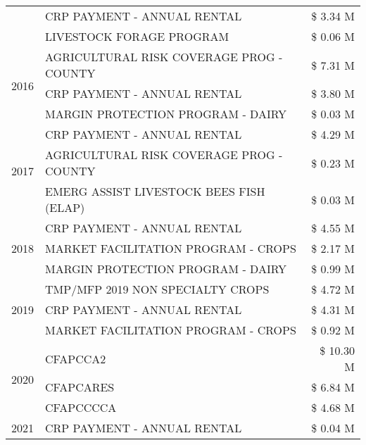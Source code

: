 \begin{tabular}{llr}
 & CRP PAYMENT - ANNUAL RENTAL & \$ 3.34 M \\
 & LIVESTOCK FORAGE PROGRAM & \$ 0.06 M \\
\cline{1-3}
\multirow[t]{3}{*}{2016} & AGRICULTURAL RISK COVERAGE PROG - COUNTY & \$ 7.31 M \\
 & CRP PAYMENT - ANNUAL RENTAL & \$ 3.80 M \\
 & MARGIN PROTECTION PROGRAM - DAIRY & \$ 0.03 M \\
\cline{1-3}
\multirow[t]{3}{*}{2017} & CRP PAYMENT - ANNUAL RENTAL & \$ 4.29 M \\
 & AGRICULTURAL RISK COVERAGE PROG - COUNTY & \$ 0.23 M \\
 & EMERG ASSIST LIVESTOCK BEES FISH (ELAP) & \$ 0.03 M \\
\cline{1-3}
\multirow[t]{3}{*}{2018} & CRP PAYMENT - ANNUAL RENTAL & \$ 4.55 M \\
 & MARKET FACILITATION PROGRAM - CROPS & \$ 2.17 M \\
 & MARGIN PROTECTION PROGRAM - DAIRY & \$ 0.99 M \\
\cline{1-3}
\multirow[t]{3}{*}{2019} & TMP/MFP 2019 NON SPECIALTY CROPS & \$ 4.72 M \\
 & CRP PAYMENT - ANNUAL RENTAL & \$ 4.31 M \\
 & MARKET FACILITATION PROGRAM - CROPS & \$ 0.92 M \\
\cline{1-3}
\multirow[t]{3}{*}{2020} & CFAPCCA2 & \$ 10.30 M \\
 & CFAPCARES & \$ 6.84 M \\
 & CFAPCCCCA & \$ 4.68 M \\
\cline{1-3}
2021 & CRP PAYMENT - ANNUAL RENTAL & \$ 0.04 M \\
\cline{1-3}
\bottomrule
\end{tabular}
